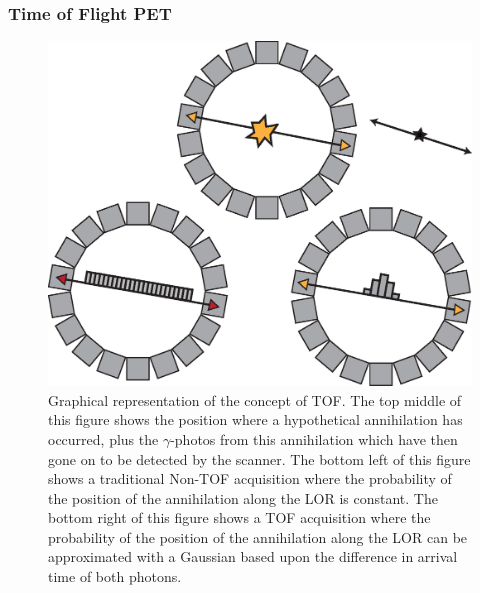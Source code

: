             \subsubsection{Time of Flight PET} \label{sec:time_of_flight_pet}
                \begin{figure}
                    \centering
                    
                    \includegraphics[width=1.0\linewidth]{figures/background_tof.png}
                    
                    \captionsetup{singlelinecheck=false, justification=raggedright}
                    \caption{Graphical representation of the concept of \gls{TOF}. The top middle of this figure shows the position where a hypothetical annihilation has occurred, plus the $\gamma$-photos from this annihilation which have then gone on to be detected by the scanner. The bottom left of this figure shows a traditional \gls{Non-TOF} acquisition where the probability of the position of the annihilation along the \gls{LOR} is constant. The bottom right of this figure shows a \gls{TOF} acquisition where the probability of the position of the annihilation along the \gls{LOR} can be approximated with a Gaussian based upon the difference in arrival time of both photons.} \label{fig:time_of_flight_pet_tof}
                \end{figure}
                
